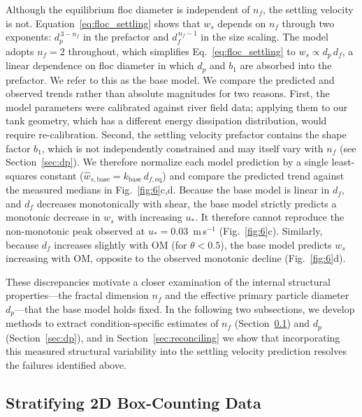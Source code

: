 \documentclass{agujournal2019}
\begin{document}
Although the equilibrium floc diameter is independent of $n_f$, the settling velocity is not. Equation~\eqref{eq:floc_settling} shows that $w_s$ depends on $n_f$ through two exponents: $d_p^{\,3-n_f}$ in the prefactor and $d_f^{\,n_f-1}$ in the size scaling. The  model adopts $n_f = 2$ throughout, which simplifies Eq.~\eqref{eq:floc_settling} to $w_s \propto d_p\, d_f$, a linear dependence on floc diameter in which $d_p$ and $b_1$ are absorbed into the prefactor. We refer to this as the base model. We compare the predicted and observed trends rather than absolute magnitudes for two reasons. First, the  model parameters were calibrated against river field data; applying them to our tank geometry, which has a different energy dissipation distribution, would require re-calibration. Second, the settling velocity prefactor contains the shape factor $b_1$, which is not independently constrained and may itself vary with $n_f$ (see Section~\ref{sec:dp}). We therefore normalize each model prediction by a single least-squares constant ($\hat{w}_{s,\text{base}} = k_{\text{base}}\, d_{f,\text{eq}}$) and compare the predicted trend against the measured medians in Fig.~\ref{fig:6}c,d. Because the base model is linear in $d_f$, and $d_f$ decreases monotonically with shear, the base model strictly predicts a monotonic decrease in $w_s$ with increasing $u_*$. It therefore cannot reproduce the non-monotonic peak observed at $u_* = 0.03$~m\,s$^{-1}$ (Fig.~\ref{fig:6}c). Similarly, because $d_f$ increases slightly with OM (for $\theta < 0.5$), the base model predicts $w_s$ increasing with OM, opposite to the observed monotonic decline (Fig.~\ref{fig:6}d).

These discrepancies motivate a closer examination of the internal structural properties---the fractal dimension $n_f$ and the effective primary particle diameter $d_p$---that the base model holds fixed. In the following two subsections, we develop methods to extract condition-specific estimates of $n_f$ (Section~\ref{sec:stratifying}) and $d_p$ (Section~\ref{sec:dp}), and in Section~\ref{sec:reconciling} we show that incorporating this measured structural variability into the settling velocity prediction resolves the failures identified above.


\subsection{Stratifying 2D Box-Counting Data}
\label{sec:stratifying}
\end{document}
